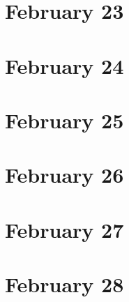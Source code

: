 \section{February 23}

\section{February 24}

\section{February 25}

\section{February 26}

\section{February 27}

\section{February 28}

